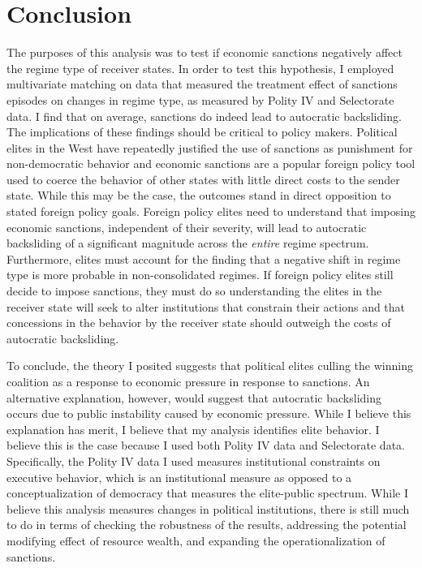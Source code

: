 \documentclass[a4paper]{article}\usepackage[]{graphicx}\usepackage[]{color}
\begin{document}
\section*{\large{Conclusion}}

The purposes of this analysis was to test if economic sanctions negatively affect the regime type of receiver states. In order to test this hypothesis, I employed multivariate matching on data that measured the treatment effect of sanctions episodes on changes in regime type, as measured by Polity IV and Selectorate data. I find that on average, sanctions do indeed lead to autocratic backsliding. The implications of these findings should be critical to policy makers. Political elites in the West have repeatedly justified the use of sanctions as punishment for non-democratic behavior and economic sanctions are a popular foreign policy tool used to coerce the behavior of other states with little direct costs to the sender state.  While this may be the case, the outcomes stand in direct opposition to stated foreign policy goals. Foreign policy elites need to understand that imposing economic sanctions, independent of their severity, will lead to autocratic backsliding of a significant magnitude across the \textit{entire} regime spectrum. Furthermore, elites must account for the finding that a negative shift in regime type is more probable in non-consolidated regimes. If foreign policy elites still decide to impose sanctions, they must do so understanding the elites in the receiver state will seek to alter institutions that constrain their actions and that concessions in the behavior by the receiver state should outweigh the costs of autocratic backsliding. 
\par
To conclude, the theory I posited suggests that political elites culling the winning coalition as a response to economic pressure in response to sanctions. An alternative explanation, however, would suggest that autocratic backsliding occurs due to public instability caused by economic pressure. While I believe this explanation has merit, I believe that my analysis identifies elite behavior. I believe this is the case because I used both Polity IV data and Selectorate data. Specifically, the Polity IV data I used measures institutional constraints on executive behavior, which is an institutional measure as opposed to a conceptualization of democracy that measures the elite-public spectrum. While I believe this analysis measures changes in political institutions, there is still much to do in terms of checking the robustness of the results, addressing the potential modifying effect of resource wealth, and expanding the operationalization of sanctions. 



\end{document}
